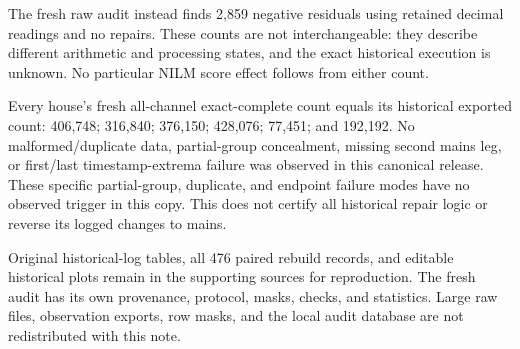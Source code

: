 \documentclass[11pt,letterpaper]{article}
\begin{document}
The fresh raw audit instead finds 2,859 negative residuals using retained decimal readings and no repairs. These counts are not interchangeable: they describe different arithmetic and processing states, and the exact historical execution is unknown. No particular NILM score effect follows from either count.

Every house's fresh all-channel exact-complete count equals its historical exported count: 406,748; 316,840; 376,150; 428,076; 77,451; and 192,192. No malformed/duplicate data, partial-group concealment, missing second mains leg, or first/last timestamp-extrema failure was observed in this canonical release. These specific partial-group, duplicate, and endpoint failure modes have no observed trigger in this copy. This does not certify all historical repair logic or reverse its logged changes to mains.

Original historical-log tables, all 476 paired rebuild records, and editable historical plots remain in the supporting sources for reproduction. The fresh audit has its own provenance, protocol, masks, checks, and statistics. Large raw files, observation exports, row masks, and the local audit database are not redistributed with this note.
\end{document}
